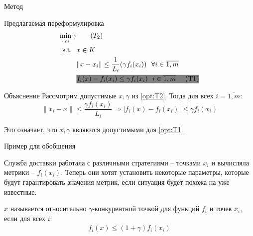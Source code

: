 \documentclass{beamer}
\newcommand\marker[2]{{\fboxsep=0pt\colorbox{#1}{\strut #2}}}
\newcommand{\tvi}{f_i(x_i)}
\begin{document}
\begin{frame}{Метод}
\begin{block}{Предлагаемая переформулировка}      
    \begin{align*}
    \min_{x, \gamma} \gamma &  \tag{$T_2$}\label{opt:T2}  \\    
    \text{s.t.}~~ & x \in K \\
            & \| x - x_i\| \leq \frac{1}{L_i}(\gamma \tvi)  ~~ \forall i\in\overline{1,m}\\
                &\marker{gray}{$f_i(x) - \tvi \leq  \gamma \tvi ~~  i\in\overline{1, m}$ ~~~\text{(T1)}}
    \end{align*}
\end{block}

\begin{block}{Объяснение}
      Рассмотрим допустимые $x, \gamma$ из \ref{opt:T2}. Тогда для всех $i=\overline{1, m}$:
    \begin{equation}
        \|x_i - x\| \leq \frac{\gamma \tvi}{L_i}  \Rightarrow 
         |f_i(x) - \tvi| \leq \gamma \tvi
    \end{equation}
            \item Это означает, что $x, \gamma$ являются допустимыми для \ref{opt:T1}.
    \end{block}
\end{frame}

\begin{frame}{Пример для обобщения}

\begin{example}\label{example:2}
    Служба доставки работала с различными стратегиями -- точками $x_i$ и вычисляла метрики -- $f_i(x_i)$. Теперь они хотят установить некоторые параметры, которые будут гарантировать значения метрик, если ситуация будет похожа на уже известные.
\end{example}

\begin{definition}
$x$ называется относительно $\gamma$-конкурентной точкой для функций $f_i$ и точек $x_i$, если для всех $i$:
\begin{align}
    f_i(x) \leq (1 + \gamma) f_i(x_i)
\end{align}
\end{definition}

\end{frame}
\end{document}

